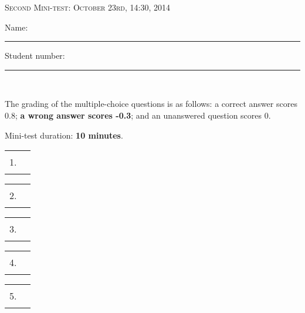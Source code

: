 \documentclass{docist}
\begin{document}
\thispagestyle{empty}

\begin{center}
  {\Large \textsc{Second Mini-test: October 23rd, 14:30, 2014\\[2ex]}}
  {\normalsize    Name: \rule{8cm}{1pt} Student number: \rule{2cm}{1pt}\\[2ex]}
\end{center}

The grading of the multiple-choice questions is as follows: a correct answer scores 0.8; \textbf{a wrong answer scores -0.3}; and an unanswered question scores 0. 

Mini-test duration: \textbf{10 minutes}. 

\begin{center}
%
  \begin{tabular}{rc}
    1. & \rule{1cm}{1pt} \\[2ex]
  \end{tabular}
  \hspace*{0.7cm}
  \begin{tabular}{rc}
    2. & \rule{1cm}{1pt} \\[2ex]
  \end{tabular}
  \hspace*{0.7cm}
  \begin{tabular}{rc}
    3. & \rule{1cm}{1pt} \\[2ex]
  \end{tabular}
  \hspace*{0.7cm}
  \begin{tabular}{rc}
    4. & \rule{1cm}{1pt} \\[2ex]
  \end{tabular}
  \hspace*{0.7cm}
  \begin{tabular}{rc}
    5. & \rule{1cm}{1pt} \\[2ex]
  \end{tabular}
\end{center}



%
%

\qInteroperabilityScenario

%
%

\qGarbageCollector

%
%

\qGraphiteBackend

%
%

\qSeparateEntities

%
%

\qChromeUsability
\end{document}
